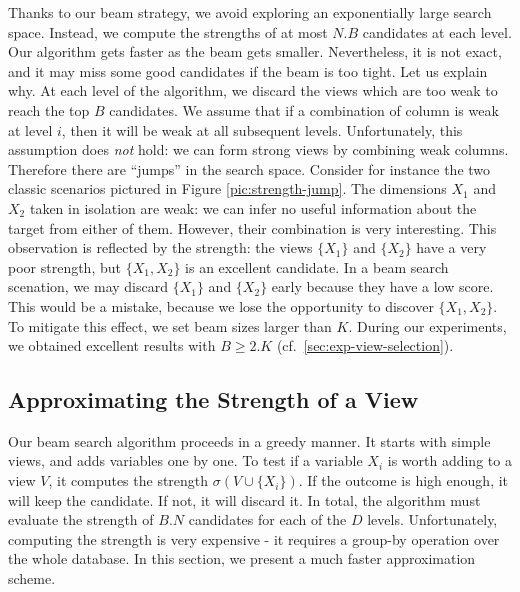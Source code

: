 Thanks to our beam strategy, we avoid exploring an exponentially large search
space. Instead, we compute the strengths of at most $N.B$ candidates at each
level. Our algorithm gets faster as the beam gets smaller.  Nevertheless, it is
not exact, and it may miss some good candidates if the beam is too tight. Let
us explain why. At each level of the algorithm, we discard the views which are
too weak to reach the top $B$ candidates. We assume that if a combination of
column is weak at level $i$, then it will be weak at all subsequent levels.
Unfortunately, this assumption does \emph{not} hold: we can form strong views by
combining weak columns. Therefore there are ``jumps'' in the search space.
Consider for instance the two classic scenarios pictured in Figure
\ref{pic:strength-jump}.  The dimensions $X_1$ and $X_2$ taken in isolation are
weak: we can infer no useful information about the target from either of them.
However, their combination is very interesting.  This observation is reflected
by the strength: the views $\{X_1\}$ and $\{X_2\}$ have a very poor strength,
but $\{X_1, X_2\}$ is an excellent candidate. In a beam search scenation, we
may discard $\{X_1\}$ and $\{X_2\}$ early because they have a low score.  This
would be a mistake, because we lose the opportunity to discover $\{X_1, X_2\}$.
To mitigate this effect, we set beam sizes larger than $K$.  During our
experiments, we obtained excellent results with $B \geq 2.K$
(cf.~\ref{sec:exp-view-selection}).


\subsection{Approximating the Strength of a View}
Our beam search algorithm proceeds in a greedy manner. It starts with simple
views, and adds variables one by one. To test if a variable $X_i$ is worth
adding to a view $V$, it computes the strength $\sigma(V \cup \{X_i\})$. If the
outcome is high enough, it will keep the candidate. If not, it will discard it.
In total, the algorithm must evaluate the strength of $B.N$ candidates for each
of the $D$ levels.  Unfortunately, computing the strength is very expensive -
it requires a group-by operation over the whole database. In this section, we present a
much faster approximation scheme.
 
